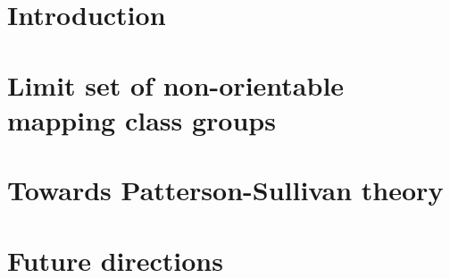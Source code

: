 \documentclass[leqno, 12pt]{report} %
\numberwithin{equation}{section}
\numberwithin{theorem}{chapter}        %
\begin{document}





\chapter{Introduction}
\label{chap:introduction}
\setcounter{page}{1} %


% 

\chapter{Limit set of non-orientable mapping class groups}
\label{chap:limit-set-paper}

% 





\chapter{Towards Patterson-Sullivan theory}
\label{chap:stat-convex-cocompact}

% 







\chapter{Future directions}
\label{chap:future-directions}


\newpage
{}
% 
\printbibliography
\end{document}
